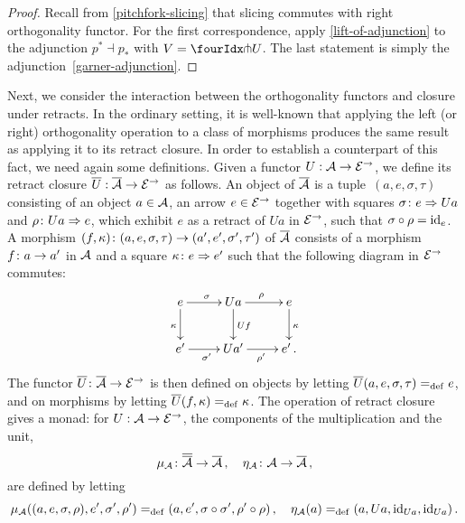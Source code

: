 \documentclass[reqno,10pt,a4paper,oneside]{amsart}
\begin{document}
\begin{proof}
Recall from \cref{pitchfork-slicing} that slicing commutes with right orthogonality functor.
For the first correspondence, apply \cref{lift-of-adjunction} to the adjunction $p^* \dashv p_*$ with  $V = \liftr{U}$.
The last statement is simply the adjunction~\eqref{garner-adjunction}.
\end{proof}

\medskip

Next, we consider the interaction between the orthogonality functors and closure under retracts. In the ordinary setting, it is well-known that
applying the left (or right) orthogonality operation to a class of morphisms produces the same result as applying it to its retract closure. 
In order to establish a counterpart of this fact, we need again some definitions. 
Given a  functor $U : \cal{A} \to \catE^{\to}$, we define its retract closure $\overline{U} : \overline{\cal{A}} \to \catE^{\to}$ as follows. 
An object of $\overline{\cal{A}}$ is a tuple~$(a, e, \sigma, \tau)$ consisting of an object $a \in \cal{A}$, an arrow $e \in \cal{E}^\to$ together with squares $\sigma \co e \Rightarrow Ua$ and $\rho \co Ua \Rightarrow e$,
which exhibit $e$ as a retract of $U a$ in  $\catE^{\to}$,  \ie such that $\sigma \cc \rho = \id_e$. 
A morphism $(f, \kappa) \co (a, e, \sigma, \tau) \to (a', e', \sigma', \tau')$ of $\overline{\cal{A}}$  consists of a morphism $f \co a \to a'$ in $\cal{A}$ and a square $\kappa \co e \Rightarrow e'$  such that the following diagram in $\cal{E}^\to$ commutes:
\[
\xymatrix{
  e
  \ar[r]^{\sigma}
    \ar[d]_{\kappa}
&
  U a
  \ar[r]^{\rho}
  \ar[d]^{U f}
&
  e
  \ar[d]^{\kappa}
\\
  e'
  \ar[r]_{\sigma'}
&
  Ua'
  \ar[r]_{\rho'}
&
  e' \, .
}
\]
The functor $\overline{U} \co \overline{\cal{A}} \to \catE^\to$ is then defined  on objects  by letting $\overline{U}(a, e, \sigma, \tau) \defeq e$,
and on morphisms by letting $\overline{U}(f, \kappa) \defeq \kappa$. The operation of retract closure gives a monad: for $U : \cal{A} \to \catE^{\to}$,
the components of the multiplication and the unit, 
\[
\mu_\cal{A} \co \overline{\overline{\cal{A}}} \to \overline{\cal{A}} \, , \quad
\eta_\cal{A} \co \cal{A} \to \overline{\cal{A}} \, ,
\]
are defined by letting
\[
\mu_\cal{A}((a, e, \sigma,  \rho), e', \sigma', \rho') \defeq (a, e', \sigma \cc \sigma', \rho' \cc \rho) \, , \quad
\eta_\cal{A}(a) \defeq (a, Ua, \id_{Ua}, \id_{Ua}) \, .
\]
\end{document}
